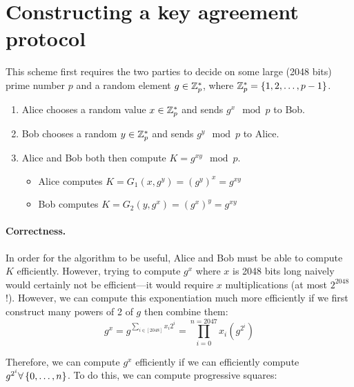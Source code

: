 \section{Constructing a key agreement protocol}


This scheme first requires the two parties to decide on some large (2048 bits) prime number $p$ and a random element $g \in \mathbb{Z}_p^*$, where $\mathbb{Z}_p^* = \left\{ 1, 2, \ldots, p-1 \right\}$. 

\begin{enumerate}[noitemsep]
	\item Alice chooses a random value $x \in \mathbb{Z}_p^*$ and sends $g^x \mod p$ to Bob.
	\item Bob chooses a random $y \in \mathbb{Z}_p^*$ and sends $g^y \mod p$ to Alice.
	\item Alice and Bob both then compute $K = g^{xy} \mod p$.
		\begin{itemize}
			\item Alice computes $K = G_1(x, g^y) = (g^y)^x = g^{xy}$
			\item Bob computes $K = G_2(y, g^x) = (g^x)^y = g^{xy}$
		\end{itemize}
\end{enumerate}

\paragraph{Correctness.} In order for the algorithm to be useful, Alice and Bob must be able to compute $K$ efficiently. However, trying to compute $g^x$ where $x$ is 2048 bits long naively would certainly not be efficient---it would require $x$ multiplications (at most $2^{2048}$!). However, we can compute this exponentiation much more efficiently if we first construct many powers of 2 of $g$ then combine them:
\[ g^x = g^{\sum_{i \in [2048]} x_i 2^i} = \prod_{i=0}^{n = 2047} x_i(g^{2^i}) \] 

Therefore, we can compute $g^x$ efficiently if we can efficiently compute $g^{2^i} \forall \left\{ 0, \ldots, n \right\}$. To do this, we can compute progressive squares: 

